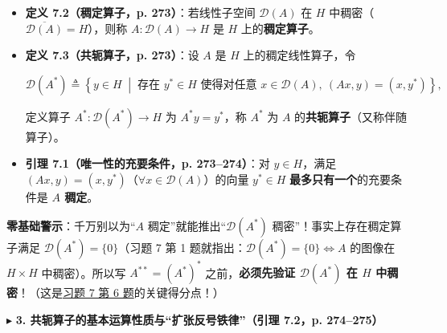 \documentclass[11pt,a4paper]{article}
\providecommand{\tightlist}{\setlength{\itemsep}{1.8pt}\setlength{\parskip}{0pt}}
\newcommand{\SubSubHeading}[1]{%
  \Needspace{6.5\baselineskip}\vspace{5.5pt}\noindent
  \textcolor{AccentMain}{\scriptsize$\blacktriangleright$}\hspace{4pt}%
  {\small\bfseries\color{AccentMain}#1}\par\nopagebreak[4]\vspace{2.5pt}%
}
\renewenvironment{quote}{%
  \begin{tcolorbox}[
    enhanced,
    breakable,
    colback=AccentSoft!48!white,
    colframe=AccentMain,
    boxrule=0pt,
    leftrule=2.8pt,
    arc=2.5pt,
    left=9pt, right=8pt, top=6pt, bottom=6pt,
    before skip=5.5pt, after skip=5.5pt
  ]\small
}{%
  \end{tcolorbox}%
}
\newcommand{\FitDisplayMath}[1]{%
  \par\vspace{4pt}\noindent
  \begin{adjustbox}{max width=\linewidth, center}
    $\displaystyle #1$
  \end{adjustbox}
  \par\vspace{4pt}%
}
\begin{document}
\begin{itemize}
\tightlist
\item
  \textbf{定义 7.2（稠定算子，p. 273）}：若线性子空间 \(\mathcal{D}(A)\) 在 \(H\) 中稠密（\(\overline{\mathcal{D}(A)} = H\)），则称 \(A: \mathcal{D}(A) \to H\) 是 \(H\) 上的\textbf{稠定算子}。
\item
  \textbf{定义 7.3（共轭算子，p. 273）}：设 \(A\) 是 \(H\) 上的稠定线性算子，令 
\FitDisplayMath{\mathcal{D}(A^*) \triangleq \left\{y \in H \;\middle|\; \text{存在 } y^* \in H \text{ 使得对任意 } x \in \mathcal{D}(A),\ (Ax, y) = (x, y^*)\right\},}
 定义算子 \(A^*: \mathcal{D}(A^*) \to H\) 为 \(A^* y = y^*\)，称 \(A^*\) 为 \(A\) 的\textbf{共轭算子}（又称伴随算子）。
\item
  \textbf{引理 7.1（唯一性的充要条件，p. 273--274）}：对 \(y \in H\)，满足 \((Ax, y) = (x, y^*)\)（\(\forall x \in \mathcal{D}(A)\)）的向量 \(y^* \in H\) \textbf{最多只有一个}的充要条件是 \textbf{\(A\) 稠定}。
\end{itemize}

\begin{quote}
\textbf{零基础警示}：千万别以为``\(A\) 稠定''就能推出``\(\mathcal{D}(A^*)\) 稠密''！事实上存在稠定算子满足 \(\mathcal{D}(A^*) = \{0\}\)（习题 7 第 1 题就指出：\(\mathcal{D}(A^*) = \{0\} \iff A\) 的图像在 \(H \times H\) 中稠密）。所以写 \(A^{**} = (A^*)^*\) 之前，\textbf{必须先验证 \(\mathcal{D}(A^*)\) 在 \(H\) 中稠密}！（这是\hyperlink{card:7-6}{\textcolor{LinkColor}{习题 7 第 6 题}}的关键得分点！）
\end{quote}

\SubSubHeading{3. 共轭算子的基本运算性质与``扩张反号铁律''（引理 7.2，p. 274--275）}
\end{document}
